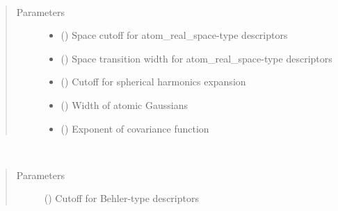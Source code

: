 \documentclass[letterpaper,10pt,english]{sphinxmanual}
\begin{document}
\begin{fulllineitems}
\label{\detokenize{descriptors:gap.descriptors.atom_real_space}}~\begin{quote}\begin{description}
\item[{Parameters}] \leavevmode\begin{itemize}
\item {} 
 () \textendash{} Space cutoff for atom\_real\_space-type descriptors

\item {} 
 () \textendash{} Space transition width for atom\_real\_space-type descriptors

\item {} 
 () \textendash{} Cutoff for spherical harmonics expansion

\item {} 
 () \textendash{} Width of atomic Gaussians

\item {} 
 () \textendash{} Exponent of covariance function

\end{itemize}

\end{description}\end{quote}

\end{fulllineitems}


\begin{fulllineitems}
\label{\detokenize{descriptors:gap.descriptors.behler}}~\begin{quote}\begin{description}
\item[{Parameters}] \leavevmode
{} () \textendash{} Cutoff for Behler-type descriptors

\end{description}\end{quote}

\end{fulllineitems}
\end{document}
